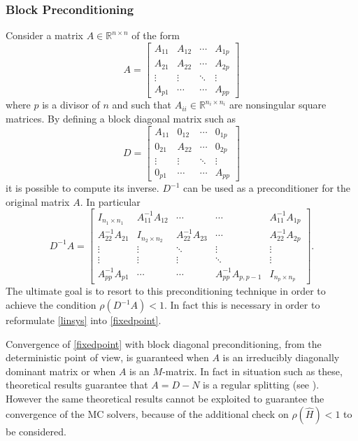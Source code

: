 \subsubsection*{Block Preconditioning}
Consider a matrix $A\in\mathbb{R}^{n\times n}$ of the form
\[
 A=\begin{bmatrix}A_{11} & A_{12} & \cdots & A_{1p}\\
    A_{21} & A_{22} & \cdots & A_{2p}\\
    \vdots & \vdots & \ddots & \vdots \\
    A_{p1} & \cdots & \cdots & A_{pp}
   \end{bmatrix}
\]
where $p$ is a divisor of $n$ and such that $A_{ii} \in \mathbb{R}^{n_i
\times n_i}$ are nonsingular square matrices.
By defining a block diagonal matrix such as
\[
 D=\begin{bmatrix}A_{11} & 0_{12} & \cdots & 0_{1p}\\
    0_{21} & A_{22} & \cdots & 0_{2p}\\
    \vdots & \vdots & \ddots & \vdots \\
    0_{p1} & \cdots & \cdots & A_{pp}
   \end{bmatrix}
\]
it is possible to compute its inverse.
$D^{-1}$  can be used as a preconditioner for the original matrix $A$.
In particular
\[
 D^{-1}A=\begin{bmatrix}I_{n_1\times n_1} & A_{11}^{-1}A_{12} & \cdots &
\cdots & A_{11}^{-1}A_{1p} \\
A_{22}^{-1}A_{21} & I_{n_2\times n_2} & A_{22}^{-1}A_{23} &
\cdots & A_{22}^{-1}A_{2p}\\
\vdots & \vdots & \ddots & \vdots & \vdots\\
\vdots & \vdots & \vdots &\ddots & \vdots \\
A_{pp}^{-1}A_{p1} &  \cdots & \cdots&
A_{pp}^{-1}A_{p,p-1} & I_{n_p \times n_p}
\end{bmatrix}.
\]
The ultimate goal is to resort to this preconditioning technique in order to
achieve the condition $\rho(D^{-1}A)<1$. In fact this is necessary in order to
reformulate \ref{linsys} into \ref{fixedpoint}.

Convergence of \ref{fixedpoint} with block diagonal preconditioning, from the
deterministic point of view, is guaranteed when $A$ is an irreducibly
diagonally dominant matrix or when $A$ is an $M$-matrix. In fact in situation
such as these, theoretical results guarantee that $A=D-N$ is a regular
splitting (see \cite{Ax1996}). However the same theoretical results cannot be
exploited to guarantee the convergence of the MC solvers, because of the
additional check on $\rho(\hat{H})<1$ to be considered.

